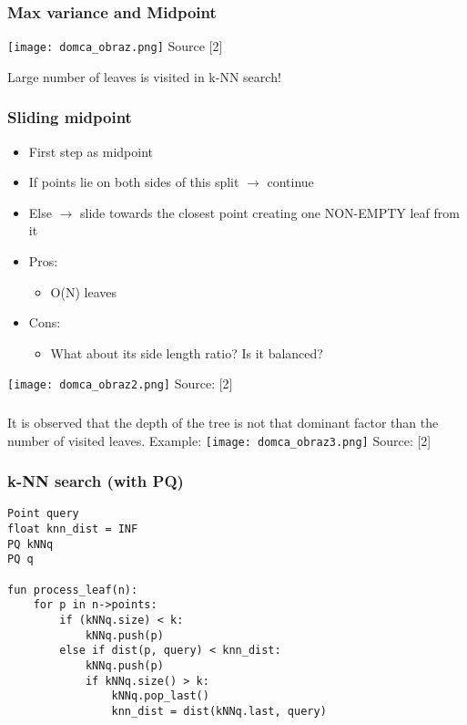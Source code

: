 \documentclass{beamer}
\begin{document}
\begin{frame}
 \frametitle{Max variance and Midpoint}
 \centering
 \texttt{[image: domca\_obraz.png]}
 Source [2]
 
 Large number of leaves is visited in k-NN search!
\end{frame}

\begin{frame}
 \frametitle{Sliding midpoint}
 \begin{itemize}
  \item First step as midpoint
  \item If points lie on both sides of this split $\rightarrow$ continue
  \item Else $\rightarrow$ slide towards the closest point creating one NON-EMPTY leaf from it
  
  \item Pros:
  \begin{itemize}
   \item O(N) leaves
  \end{itemize}
  \item Cons:
  \begin{itemize}
   \item What about its side length ratio? Is it balanced?
  \end{itemize}
 \end{itemize}
 
\centering
\texttt{[image: domca\_obraz2.png]}
Source: [2]


\end{frame}

\begin{frame}
 \frametitle{}
 It is observed that the depth of the tree is not that dominant factor
than the number of visited leaves.
Example:
\centering
\texttt{[image: domca\_obraz3.png]}
Source: [2]
\end{frame}

\begin{frame}[fragile]
 \frametitle{k-NN search (with PQ)}
 \begin{lstlisting}[style=CStyle]
Point query
float knn_dist = INF
PQ kNNq
PQ q

fun process_leaf(n):
	for p in n->points:
		if (kNNq.size) < k:
			kNNq.push(p)
		else if dist(p, query) < knn_dist:
			kNNq.push(p)
			if kNNq.size() > k:
				kNNq.pop_last()
				knn_dist = dist(kNNq.last, query)
 \end{lstlisting}
\end{frame}
\end{document}
